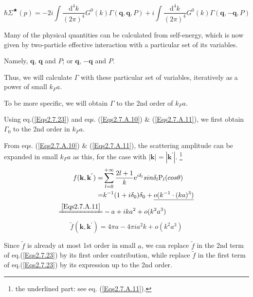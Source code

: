 \begin{equation} \label{Eqs2.7.25}
\hbar \Sigma^{\bigstar}(p) = -2 i \int \frac{\mathrm{d}^4 k}{(2\pi)^4} G^0(k)\Gamma(\mathbf{q},\mathbf{q},P) + i \int \frac{\mathrm{d}^4 k}{(2\pi)^4} G^0(k)\Gamma(\mathbf{q},-\mathbf{q},P)
\end{equation}

Many of the physical quantities can be calculated from self-energy, which is now given by two-particle effective interaction with a particular set of its variables.

Namely, $\mathbf{q}$, $\mathbf{q}$ and $P$; or $\mathbf{q}$, $-\mathbf{q}$ and $P$.

Thus, we will calculate $\Gamma$ with these particular set of variables, iteratively as a power of small $k_F a$.

To be more specific, we will obtain $\Gamma$ to the 2nd order of $k_F a$.

Using eq.(\ref{Eqs2.7.23}) and eqs. (\ref{Eqs2.7.A.10}) \& (\ref{Eqs2.7.A.11}), we first obtain $\Gamma_0$ to the 2nd order in $k_F a$.

From eqs. (\ref{Eqs2.7.A.10}) \& (\ref{Eqs2.7.A.11}), the scattering amplitude can be expanded in small $k_F a$ as this, for the case with $|\mathbf{k}|=|\mathbf{k}^{'}|$.
\footnote{the underlined part: see eq. (\ref{Eqs2.7.A.11}).}
\[ \begin{split} f(\mathbf{k},\mathbf{k}^{'}) =& \sum_{l=0}^{+\infty} \frac{2l+1}{k} \mathrm{e}^{i \delta_l} sin \delta_l \mathrm{P}_l(cos\theta)\\
=& k^{-1} (1+i \delta_0) \delta_0 + \underline{o(k^{-1} \cdot (k a)^3)}\\
\xlongequal{\ref{Eqs2.7.A.11}}& -a + i k a^2 + o(k^2 a^3)
\end{split} \]
\[ \tilde{f}(\mathbf{k},\mathbf{k}^{'}) = 4\pi a - 4\pi i a^2 k + o(k^2 a^3) \]

Since $\tilde{f}$ is already at most 1st order in small $a$, we can replace $\tilde{f}$ in the 2nd term of eq.(\ref{Eqs2.7.23}) by its first order contribution, while replace $\tilde{f}$ in the first term of eq.(\ref{Eqs2.7.23}) by its expression up to the 2nd order.

